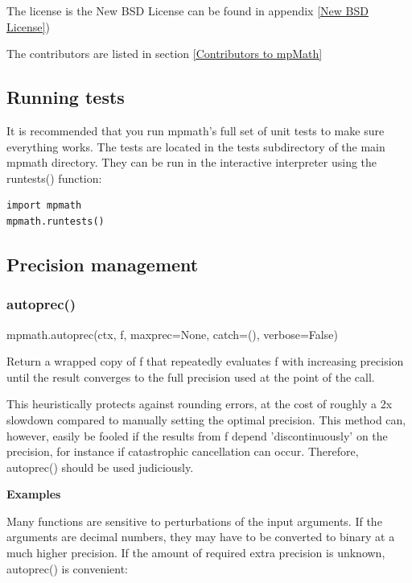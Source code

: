 \vpara
The license is the New BSD License  can be found in appendix \ref{New BSD License})

The contributors are listed in section \ref{Contributors to mpMath}



\subsection{Running tests}

It is recommended that you run mpmath's full set of unit tests to make sure everything works. The tests are located in the tests subdirectory of the main mpmath directory. They can be run in the interactive interpreter using the runtests() function:


\begin{lstlisting}
import mpmath
mpmath.runtests()
\end{lstlisting}



\subsection{Precision management}

\subsubsection{autoprec()}

mpmath.autoprec(ctx, f, maxprec=None, catch=(), verbose=False)

\vpara
Return a wrapped copy of f that repeatedly evaluates f with increasing precision until the result converges to the full precision used at the point of the call.

\vpara
This heuristically protects against rounding errors, at the cost of roughly a 2x slowdown compared to manually setting the optimal precision. This method can, however, easily be fooled if the results from f depend 'discontinuously' on the precision, for instance if catastrophic cancellation can occur. Therefore, autoprec() should be used judiciously.

\vpara
\textbf{Examples}

\vpara
Many functions are sensitive to perturbations of the input arguments. If the arguments are decimal numbers, they may have to be converted to binary at a much higher precision. If the amount of required extra precision is unknown, autoprec() is convenient:

